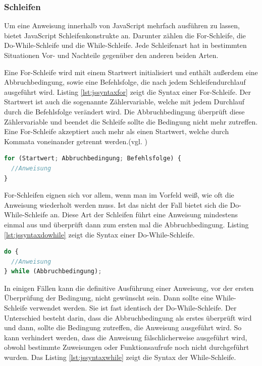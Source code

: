 \subsubsection{Schleifen} Um eine Anweisung innerhalb von JavaScript mehrfach ausführen zu lassen, bietet JavaScript Schleifenkonstrukte an. Darunter zählen die For-Schleife, die Do-While-Schleife und die While-Schleife. Jede Schleifenart hat in bestimmten Situationen Vor- und Nachteile gegenüber den anderen beiden Arten.\par Eine For-Schleife wird mit einem Startwert initialisiert und enthält außerdem eine Abbruchbedingung, sowie eine Befehlsfolge, die nach jedem Schleifendurchlauf ausgeführt wird. Listing \ref{lst:jssyntaxfor} zeigt die Syntax einer For-Schleife. Der Startwert ist auch die sogenannte Zählervariable, welche mit jedem Durchlauf durch die Befehlsfolge verändert wird. Die Abbruchbedingung überprüft diese Zählervariable und beendet die Schleife sollte die Bedingung nicht mehr zutreffen. Eine For-Schleife akzeptiert auch mehr als einen Startwert, welche durch Kommata voneinander getrennt werden.(vgl. \cite[S.75f]{WenzJava2008})

\vspace{1em}
\begin{lstlisting}[language=JavaScript, caption=Syntax For-Schleife, label=lst:jssyntaxfor]
for (Startwert; Abbruchbedingung; Befehlsfolge) {
  //Anweisung
}
\end{lstlisting}
	
For-Schleifen eignen sich vor allem, wenn man im Vorfeld weiß, wie oft die Anweisung wiederholt werden muss. Ist das nicht der Fall bietet sich die Do-While-Schleife an. Diese Art der Schleifen führt eine Anweisung mindestens einmal aus und überprüft dann zum ersten mal die Abbruchbedingung. Listing \ref{lst:jssyntaxdowhile} zeigt die Syntax einer Do-While-Schleife.

\vspace{1em}
\begin{lstlisting}[language=JavaScript, caption=Syntax Do-While-Schleife, label=lst:jssyntaxdowhile]
do {
  //Anweisung
} while (Abbruchbedingung);
\end{lstlisting}

In einigen Fällen kann die definitive Ausführung einer Anweisung, vor der ersten Überprüfung der Bedingung, nicht gewünscht sein. Dann sollte eine While-Schleife verwendet werden. Sie ist fast identisch der Do-While-Schleife. Der Unterschied besteht darin, dass die Abbruchbedingung als erstes überprüft wird und dann, sollte die Bedingung zutreffen, die Anweisung ausgeführt wird. So kann verhindert werden, dass die Anweisung fälschlicherweise ausgeführt wird, obwohl bestimmte Zuweisungen oder Funktionsaufrufe noch nicht durchgeführt wurden. Das Listing \ref{lst:jssyntaxwhile} zeigt die Syntax der While-Schleife.

